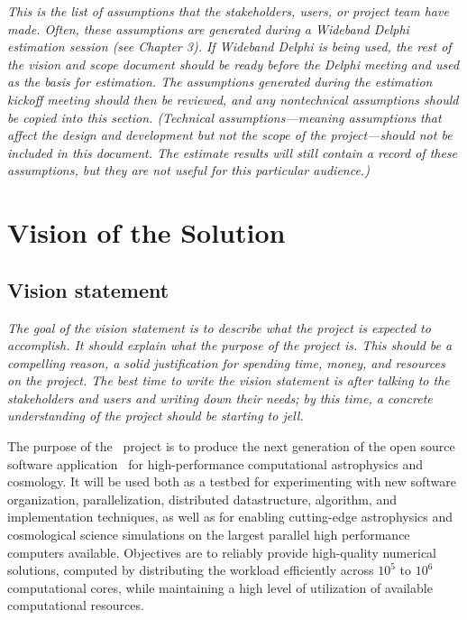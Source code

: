 \documentclass{article}
\begin{document}
    \textit{This is the list of assumptions that the stakeholders, users, or
    project team have made. Often, these assumptions are generated
    during a Wideband Delphi estimation session (see Chapter 3). If
    Wideband Delphi is being used, the rest of the vision and scope
    document should be ready before the Delphi meeting and used as the
    basis for estimation. The assumptions generated during the
    estimation kickoff meeting should then be reviewed, and any
    nontechnical assumptions should be copied into this
    section. (Technical assumptions---meaning assumptions that affect
    the design and development but not the scope of the
    project---should not be included in this document. The estimate
    results will still contain a record of these assumptions, but they
    are not useful for this particular audience.)}

\section{Vision of the Solution}

\subsection{Vision statement}

    \textit{The goal of the vision statement is to describe what the project
    is expected to accomplish. It should explain what the purpose of
    the project is. This should be a compelling reason, a solid
    justification for spending time, money, and resources on the
    project. The best time to write the vision statement is after
    talking to the stakeholders and users and writing down their
    needs; by this time, a concrete understanding of the project
    should be starting to jell.}

    The purpose of the \cello\ project is to produce the next
    generation of the open source software application \enzo\ for
    high-performance computational astrophysics and cosmology.  It
    will be used both as a testbed for experimenting with new software
    organization, parallelization, distributed datastructure,
    algorithm, and implementation techniques, as well as for enabling
    cutting-edge astrophysics and cosmological science simulations on
    the largest parallel high performance computers available.
    Objectives are to reliably provide high-quality numerical
    solutions, computed by distributing the workload efficiently
    across $10^5$ to $10^6$ computational cores, while maintaining a
    high level of utilization of available computational resources.
\end{document}
